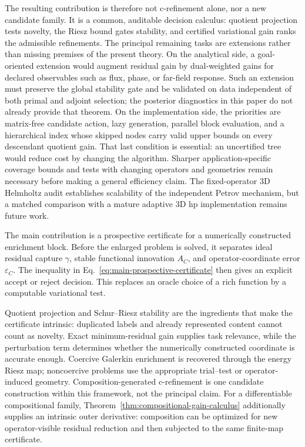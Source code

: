 \documentclass[11pt]{article}
\numberwithin{algorithm}{section}
\theoremstyle{definition}\newtheorem{definition}[theorem]{Definition}
\theoremstyle{remark}\newtheorem{remark}[theorem]{Remark}
\begin{document}
The resulting contribution is therefore not c-refinement alone, nor a new
candidate family.  It is a common, auditable decision calculus: quotient
projection tests novelty, the Riesz bound gates stability, and certified
variational gain ranks the admissible refinements.  The principal remaining tasks
are extensions rather than missing premises of the present theory.  On the analytical side, a
goal-oriented extension would augment residual gain by dual-weighted gains for
declared observables such as flux, phase, or far-field response.  Such an
extension must preserve the global stability gate and be validated on data
independent of both primal and adjoint selection; the posterior diagnostics in
this paper do not already provide that theorem.  On the implementation side,
the priorities are matrix-free candidate action, lazy generation, parallel
block evaluation, and a hierarchical index whose skipped nodes carry valid
upper bounds on every descendant quotient gain.  That last condition is
essential: an uncertified tree would reduce cost by changing the algorithm.
Sharper application-specific coverage bounds and tests with changing
operators and geometries remain necessary before making a general efficiency
claim.  The fixed-operator 3D Helmholtz audit establishes
scalability of the independent Petrov mechanism, but a matched comparison with
a mature adaptive 3D hp implementation remains future work.

\iffalse
The main contribution is a prospective certificate for a numerically
constructed enrichment block.  Before the enlarged problem is solved, it
separates ideal residual capture $\gamma$, stable functional innovation
$A_C$, and operator-coordinate error $\varepsilon_C$.  The inequality in
Eq.~\eqref{eq:main-prospective-certificate} then gives an explicit accept or
reject decision.  This replaces an oracle choice of a rich function by a
computable variational test.

Quotient projection and Schur--Riesz stability are the ingredients that make
the certificate intrinsic: duplicated labels and already represented content
cannot count as novelty.  Exact minimum-residual gain supplies task relevance,
while the perturbation term determines whether the numerically constructed
coordinate is accurate enough.  Coercive Galerkin enrichment is recovered
through the energy Riesz map; noncoercive problems use the appropriate
trial--test or operator-induced geometry.  Composition-generated c-refinement
is one candidate construction within this framework, not the principal claim.
For a differentiable compositional family,
Theorem~\ref{thm:compositional-gain-calculus} additionally supplies an
intrinsic outer derivative: composition can be optimized for new
operator-visible residual reduction and then subjected to the same finite-map
certificate.
\end{document}
